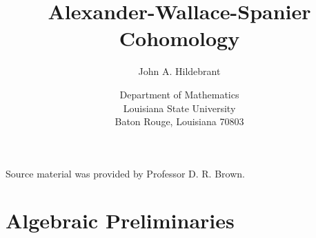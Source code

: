 \documentclass{article}
\let\titlepageAuthor\author
\renewcommand{\author}[1]{\newcommand{\headerAuthor}{#1}\titlepageAuthor{#1}}
\let\titlepageTitle\title
\renewcommand{\title}[1]{\newcommand{\headerTitle}{#1}\titlepageTitle{#1}}
\begin{document}
\title{Alexander-Wallace-Spanier Cohomology}
\author{John A. Hildebrant}
\date{\vspace{3cm}
 Department of Mathematics
 \\ Louisiana State University
 \\ Baton Rouge, Louisiana 70803
 }
\maketitle
\thispagestyle{empty}



\newpage

\setcounter{tocdepth}{3} 
\tableofcontents
\thispagestyle{empty}


\newpage



Source material was provided by Professor D. R. Brown.



\section{Algebraic Preliminaries}

\end{document}
